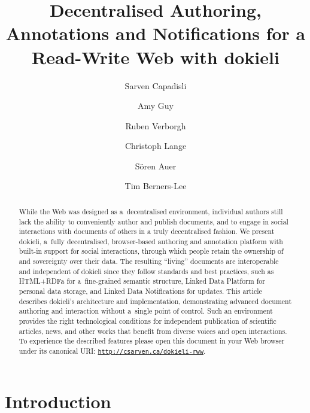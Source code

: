 \documentclass[a4paper]{llncs}
\begin{document}
\title{Decentralised Authoring, Annotations and Notifications for a Read-Write Web with dokieli}

\author{Sarven Capadisli
  \and Amy Guy
  \and Ruben Verborgh
  \and Christoph Lange
  \and Sören Auer
  \and Tim Berners-Lee}
\maketitle

\begin{abstract}
  While the Web was designed as a decentralised environment, individual authors still lack the ability to conveniently author and publish documents, and to engage in social interactions with documents of others in a truly decentralised fashion. We present \empty dokieli, a fully decentralised, browser-based authoring and annotation platform with built-in support for social interactions, through which people retain the ownership of and sovereignty over their data. The resulting “living” documents are interoperable and independent of dokieli since they follow standards and best practices, such as HTML+RDFa for a fine-grained semantic structure, Linked Data Platform for personal data storage, and Linked Data Notifications for updates. This article describes dokieli’s architecture and implementation, demonstrating advanced document authoring and interaction without a single point of control. Such an environment provides the right technological conditions for independent publication of scientific articles, news, and other works that benefit from diverse voices and open interactions. To experience the described features please open this document in your Web browser under its canonical URI: {\tt \href{http://csarven.ca/dokieli-rww}{http://csarven.ca/dokieli-rww}}.
\end{abstract}


\section{Introduction}
\label{introduction}
\end{document}
